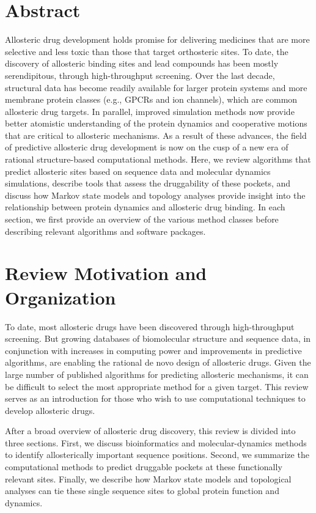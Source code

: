 ﻿%

\section{Abstract}
Allosteric drug development holds promise for delivering medicines that are more selective and less toxic than those that target orthosteric sites. To date, the discovery of allosteric binding sites and lead compounds has been mostly serendipitous, through high-throughput screening. Over the last decade, structural data has become readily available for larger protein systems and more membrane protein classes (e.g., GPCRs and ion channels), which are common allosteric drug targets. In parallel, improved simulation methods now provide better atomistic understanding of the protein dynamics and cooperative motions that are critical to allosteric mechanisms. As a result of these advances, the field of predictive allosteric drug development is now on the cusp of a new era of rational structure-based computational methods. Here, we review algorithms that predict allosteric sites based on sequence data and molecular dynamics simulations, describe tools that assess the druggability of these pockets, and discuss how Markov state models and topology analyses provide insight into the relationship between protein dynamics and allosteric drug binding. In each section, we first provide an overview of the various method classes before describing relevant algorithms and software packages.
\section{Review Motivation and Organization}
\par To date, most allosteric drugs have been discovered through high-throughput screening. But growing databases of biomolecular structure and sequence data, in conjunction with increases in computing power and improvements in predictive algorithms, are enabling the rational de novo design of allosteric drugs. Given the large number of published algorithms for predicting allosteric mechanisms, it can be difficult to select the most appropriate method for a given target. This review serves as an introduction for those who wish to use computational techniques to develop allosteric drugs.
\par After a broad overview of allosteric drug discovery, this review is divided into three sections. First, we discuss bioinformatics and molecular-dynamics methods to identify allosterically important sequence positions. Second, we summarize the computational methods to predict druggable pockets at these functionally relevant sites. Finally, we describe how Markov state models and topological analyses can tie these single sequence sites to global protein function and dynamics.
